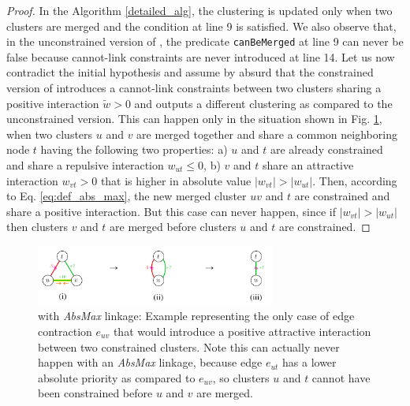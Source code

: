 \begin{proof}
In the \algname{} Algorithm \ref{detailed_alg}, the clustering is updated only when two clusters are merged and the condition at line 9 is satisfied. 
We also observe that, in the unconstrained version of \algname{}, the predicate \texttt{canBeMerged} at line 9 can never be false because cannot-link constraints are never introduced at line 14.
Let us now contradict the initial hypothesis and assume by absurd that the constrained version of \algname{} introduces a cannot-link constraints between two clusters sharing a positive interaction $\tilde{w}>0$ and outputs a different clustering as compared to the unconstrained version. 
This can happen only in the situation shown in Fig. \ref{fig:abs_max_proof_example}, when two clusters $u$ and $v$ are merged together and share a common neighboring node $t$ having the following two properties: a) $u$ and $t$ are already constrained and share a repulsive interaction $w_{ut}\leq0$, b) $v$ and $t$ share an attractive interaction $w_{vt}>0$ that is higher in absolute value $|w_{vt}|>|w_{ut}|$. 
Then, according to Eq. \ref{eq:def_abs_max}, the new merged cluster $uv$ and $t$ are constrained and share a positive interaction. 
But this case can never happen, since if $|w_{vt}|>|w_{ut}|$ then clusters $v$ and $t$ are merged before clusters $u$ and $t$ are constrained.  
\end{proof}


\begin{figure}
        \centering

        \includegraphics[width=0.7\textwidth]{./figs/proof_abs_max_example.pdf} %
\caption{\algname{} with \emph{AbsMax} linkage: Example representing the only case of edge contraction $e_{uv}$ that would introduce a positive attractive interaction between two constrained clusters. Note this can actually never happen with an \emph{AbsMax} linkage, because edge $e_{ut}$ has a lower absolute priority as compared to $e_{uv}$, so clusters $u$ and $t$ cannot have been constrained before $u$ and $v$ are merged.
}
\label{fig:abs_max_proof_example}  
\end{figure}

